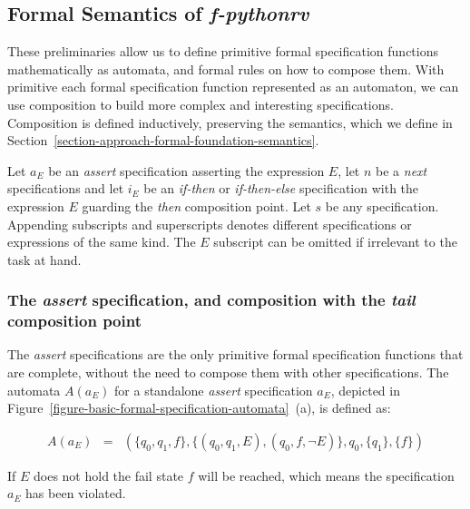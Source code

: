 




\subsection{Formal Semantics of \textit{f-pythonrv}}
\label{section-approach-composition}
\lstset{language=Python,numbers=none}

These preliminaries allow us to define primitive formal specification functions
mathematically as automata, and formal rules on how to compose them. With
primitive each formal specification function represented as an automaton, we
can use composition to build more complex and interesting specifications.
Composition is defined inductively, preserving the semantics, which we define
in Section~\ref{section-approach-formal-foundation-semantics}.

Let $a_E$ be an \textit{assert} specification asserting the
expression $E$, let $n$ be a \textit{next} specifications and let $i_E$ be an
\textit{if-then} or \textit{if-then-else} specification with the expression $E$
guarding the \textit{then} composition point. Let $s$ be any specification.
Appending subscripts and superscripts denotes different specifications or
expressions of the same kind. The $E$ subscript can be omitted if irrelevant to
the task at hand.

\subsubsection{The \textit{assert} specification, and composition with the
\textit{tail} composition point}

The \textit{assert} specifications are the only primitive formal specification
functions that are complete, without the need to compose them with other
specifications. The automata $A(a_E)$ for a standalone \textit{assert}
specification $a_E$, depicted in
Figure~\ref{figure-basic-formal-specification-automata}~(a), is defined as:

\medskip
\[
  \begin{array}{rcl}
    A(a_E) & = & (\{q_0, q_1, f\}, \{(q_0, q_1, E), (q_0, f, \neg E)\}, q_0, \{q_1\}, \{f\})
  \end{array}
\]
\medskip

If $E$ does not hold the fail state $f$ will be reached, which means the
specification $a_E$ has been violated.

